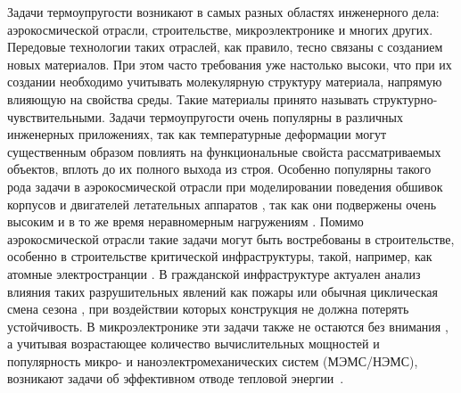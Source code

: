 
{\actuality}
\ifsynopsis
Задачи термоупругости возникают в самых разных областях инженерного дела: аэрокосмической отрасли, строительстве, микроэлектронике и многих других. Передовые технологии таких отраслей, как правило, тесно связаны с созданием новых материалов. При этом часто требования уже настолько высоки, что при их создании необходимо учитывать молекулярную структуру материала, напрямую влияющую на свойства среды. Такие материалы принято называть структурно-чувствительными.
\else
Задачи термоупругости очень популярны в различных инженерных приложениях, так как температурные деформации могут существенным образом повлиять на функциональные свойста рассматриваемых объектов, вплоть до их полного выхода из строя. Особенно популярны такого рода задачи в аэрокосмической отрасли при моделировании поведения обшивок корпусов и двигателей летательных аппаратов \cite{Aerocosmos1, Aerocosmos2, Aerocosmos3}, так как они подвержены очень высоким и в то же время неравномерным нагружениям \cite{Aerocosmos4, Aerocosmos5, Aerocosmos6, Aerocosmos7}. Помимо аэрокосмической отрасли такие задачи могут быть востребованы в строительстве, особенно в строительстве критической инфраструктуры, такой, например, как атомные электространции \cite{StroyMech1, StroyMech2}. В гражданской инфраструктуре актуален анализ влияния таких разрушительных явлений как пожары \cite{StroyMech3, StroyMech4} или обычная циклическая смена сезона \cite{StroyMech5, StroyMech6}, при воздействии которых конструкция не должна потерять устойчивость. В микроэлектронике эти задачи также не остаются без внимания \cite{MicroElectronic1, MicroElectronic2}, а учитывая возрастающее количество вычислительных мощностей и популярность микро- и наноэлектромеханических систем (МЭМС/НЭМС), возникают задачи об эффективном отводе тепловой энергии~\cite{MicroElectronic3}.
\fi

